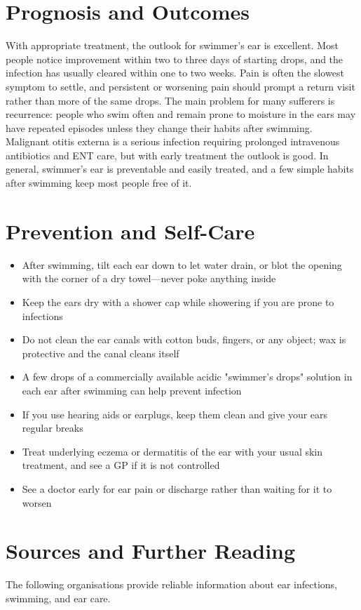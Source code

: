 \section*{Prognosis and Outcomes}
With appropriate treatment, the outlook for swimmer's ear is excellent. Most people notice improvement within two to three days of starting drops, and the infection has usually cleared within one to two weeks. Pain is often the slowest symptom to settle, and persistent or worsening pain should prompt a return visit rather than more of the same drops. The main problem for many sufferers is recurrence: people who swim often and remain prone to moisture in the ears may have repeated episodes unless they change their habits after swimming. Malignant otitis externa is a serious infection requiring prolonged intravenous antibiotics and ENT care, but with early treatment the outlook is good. In general, swimmer's ear is preventable and easily treated, and a few simple habits after swimming keep most people free of it.

\section*{Prevention and Self-Care}
\begin{itemize}
    \item After swimming, tilt each ear down to let water drain, or blot the opening with the corner of a dry towel---never poke anything inside
    \item Keep the ears dry with a shower cap while showering if you are prone to infections
    \item Do not clean the ear canals with cotton buds, fingers, or any object; wax is protective and the canal cleans itself
    \item A few drops of a commercially available acidic "swimmer's drops" solution in each ear after swimming can help prevent infection
    \item If you use hearing aids or earplugs, keep them clean and give your ears regular breaks
    \item Treat underlying eczema or dermatitis of the ear with your usual skin treatment, and see a GP if it is not controlled
    \item See a doctor early for ear pain or discharge rather than waiting for it to worsen
\end{itemize}

\section*{Sources and Further Reading}
The following organisations provide reliable information about ear infections, swimming, and ear care.

